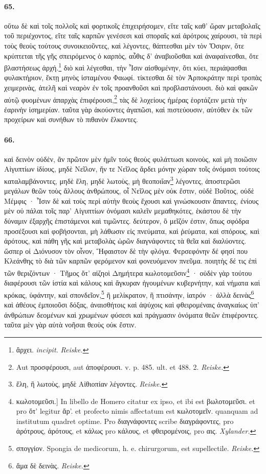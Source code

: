 \documentclass[a4paper, 11pt, oneside, polutonikogreek, german]{article}
\begin{document}
\paragraph{65.}
οὕτω δὲ καὶ τοῖς πολλοῖς καὶ φορτικοῖς ἐπιχειρήσομεν, εἴτε ταῖς καθ' ὥραν μεταβολαῖς τοῦ περιέχοντος, εἴτε ταῖς καρπῶν γενέσεσι καὶ σποραῖς καὶ ἀρότροις χαίρουσι, τὰ περὶ τοὺς θεοὺς τούτους συνοικειοῦντες, καὶ λέγοντες, θάπτεσθαι μὲν τὸν Ὄσιριν, ὅτε κρύπτεται τῆς γῆς σπειρόμενος ὁ καρπὸς, αὖθις δ' ἀναβιοῦσθαι καὶ ἀναφαίνεσθαι, ὅτε βλαστήσεως ἀρχή.\footnote{ἄρχει. \emph{incipit.} \emph{Reiske.}} διὸ καὶ λέγεσθαι, τὴν Ἶσιν αἰσθομένην, ὅτι κύει, περιάψασθαι φυλακτήριον, ἕκτῃ μηνὸς ἱσταμένου Φαωφί. τίκτεσθαι δὲ τὸν Ἁρποκράτην περὶ τροπὰς χειμερινὰς, ἀτελῆ καὶ νεαρὸν ἐν τοῖς προανθοῦσι καὶ προβλαστάνουσι. διὸ καὶ φακῶν αὐτῷ φυομένων ἀπαρχὰς ἐπιφέρουσι,\footnote{Aut προσφέρουσι, aut ἀποφέρουσι. v. p. 485. ult. et 488. 2. \emph{Reiske.}} τὰς δὲ λοχείους ἡμέρας ἑορτάζειν μετὰ τὴν ἐαρινὴν ἰσημερίαν. ταῦτα γὰρ ἀκούοντες ἀγαπῶσι, καὶ πιστεύουσιν, αὐτόθεν ἐκ τῶν προχείρων καὶ συνήθων τὸ πιθανὸν ἕλκοντες.

\paragraph{66.}
καὶ δεινὸν οὐδὲν, ἂν πρῶτον μὲν ἡμῖν τοὺς θεοὺς φυλάττωσι κοινοὺς, καὶ μὴ ποιῶσιν Αἰγυπτίων ἰδίους, μηδὲ Νεῖλον, ἥν τε Νεῖλος ἄρδει μόνην χώραν τοῖς ὀνόμασι τούτοις καταλαμβάνοντες, μηδὲ ἕλη, μηδὲ λωτοὺς, μὴ θεοποιΐαν\footnote{ἕλη, ἢ λωτοὺς, μηδὲ Αἰθιοπίαν λέγοντες. \emph{Reiske.}} λέγοντες, ἀποστερῶσι μεγάλων θεῶν τοὺς ἄλλους ἀνθρώπους, οἷ Νεῖλος μὲν οὐκ ἔστιν, οὐδὲ Βοῦτος, οὐδὲ Μέμφις · Ἶσιν δὲ καὶ τοὺς περὶ αὐτὴν θεοὺς ἔχουσι καὶ γινώσκουσιν ἅπαντες, ἐνίους μὲν οὐ πάλαι τοῖς παρ' Αἰγυπτίων ὀνόμασι καλεῖν μεμαθηκότες, ἑκάστου δὲ τὴν δύναμιν ἐξαρχῆς ἐπιστάμενοι καὶ τιμῶντες. δεύτερον, ὃ μεῖζόν ἐστιν, ὅπως σφόδρα προσέξουσι καὶ φοβήσονται, μὴ λάθωσιν εἰς πνεύματα, καὶ ῥεύματα, καὶ σπόρους, καὶ ἀρότους, καὶ πάθη γῆς καὶ μεταβολὰς ὡρῶν διαγνάφοντες τὰ θεῖα καὶ διαλύοντες. ὥσπερ οἱ Διόνυσον τὸν οἶνον, Ἥφαιστον δὲ τὴν φλόγα. Φερσεφόνην δέ φησί που Κλεάνθης τὸ διὰ τῶν καρπῶν φερόμενον καὶ φονευόμενον πνεῦμα. ποιητὴς δέ τις ἐπὶ τῶν θεριζόντων · Τῆμος ὅτ' αἰζηοὶ Δημήτερα κωλοτομεῦσιν\footnote{κωλοτομεῦσι.] In libello de Homero citatur ex ipso, et ibi est βωλοτομεῦσι. et pro ὅτ' legitur ἄρ'. et profecto nimis affectatum est κωλοτομεῖν. quanquam ad institutum quadret optime. Pro διαγνάφοντες scribe διαγράφοντες, pro ἀρότρους, ἀρότους, et κάλως pro κάλους, et φθειρομένοις, pro αις. \emph{Xylander.} } · οὐδὲν γὰρ τούτου διαφέρουσι τῶν ἱστία καὶ κάλους καὶ ἄγκυραν ἡγουμένων κυβερνήτην, καὶ νήματα καὶ κρόκας, ὑφάντην, καὶ σπονδεῖον,\footnote{σπογγίον. Spongia de medicorum, h. e. chirurgorum, est supellectile. \emph{Reiske.}} ἢ μελίκρατον, ἢ πτισάνην, ἰατρόν · ἀλλὰ δεινὰς\footnote{ἅμα δὲ δεινὰς. \emph{Reiske.}} καὶ ἀθέους ἐμποιοῦσι δόξας, ἀναισθήτοις καὶ ἀψύχοις καὶ φθειρομέναις ἀναγκαίως ὑπ' ἀνθρώπων δεομένων καὶ χρωμένων φύσεσι καὶ πράγμασιν ὀνόματα θεῶν ἐπιφέροντες. ταῦτα μὲν γὰρ αὐτὰ νοῆσαι θεοὺς οὐκ ἔστιν.
\end{document}

